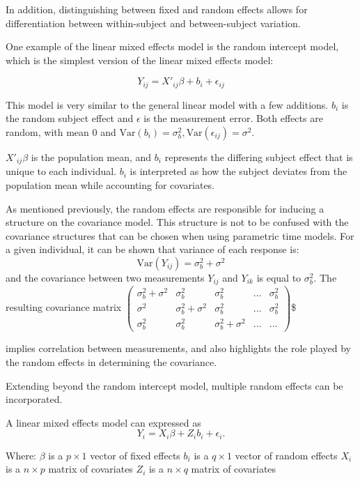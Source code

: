 \documentclass[12pt, twoside]{amherstthesis}
\begin{document}
In addition, distinguishing between fixed and random effects allows for differentiation between within-subject and between-subject variation.

One example of the linear mixed effects model is the random intercept model, which is the simplest version of the linear mixed effects model:

\[Y_{ij} = X'_{ij}\beta + b_i + \epsilon_{ij}\]

This model is very similar to the general linear model with a few additions. \(b_i\) is the random subject effect and \(\epsilon\) is the measurement error. Both effects are random, with mean 0 and \(\text{Var}(b_i) = \sigma^2_b, \text{Var}(\epsilon_{ij})=\sigma^2\).

\(X'_{ij}\beta\) is the population mean, and \(b_i\) represents the differing subject effect that is unique to each individual. \(b_i\) is interpreted as how the subject deviates from the population mean while accounting for covariates.

As mentioned previously, the random effects are responsible for inducing a structure on the covariance model. This structure is not to be confused with the covariance structures that can be chosen when using parametric time models. For a given individual, it can be shown that variance of each response is:
\[\text{Var}(Y_{ij}) = \sigma^2_b + \sigma^2\] and the covariance between two measurements \(Y_{ij}\) and \(Y_{ik}\) is equal to \(\sigma^2_b\). The resulting covariance matrix \(\begin{pmatrix} \sigma^2_b + \sigma^2 & \sigma^2_b & \sigma^2_b & ... & \sigma^2_b \\ \sigma^2 & \sigma^2_b + \sigma^2 & \sigma^2_b & ... & \sigma^2_b \\ \sigma^2_b & \sigma^2_b & \sigma^2_b + \sigma^2 & ...& ... \end{pmatrix}\)\$

implies correlation between measurements, and also highlights the role played by the random effects in determining the covariance.

Extending beyond the random intercept model, multiple random effects can be incorporated.

A linear mixed effects model can expressed as \[Y_i = X_i\beta+Z_ib_i+\epsilon_i.\]

Where:
\(\beta\) is a \(p \times 1\) vector of fixed effects
\(b_i\) is a \(q \times 1\) vector of random effects
\(X_i\) is a \(n \times p\) matrix of covariates
\(Z_i\) is a \(n \times q\) matrix of covariates
\end{document}
